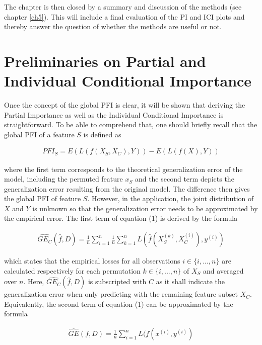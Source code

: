 \documentclass[]{krantz}
\begin{document}
The chapter is then closed by a summary and discussion of the methods
(see chapter \ref{ch5}). This will include a final evaluation of the PI
and ICI plots and thereby answer the question of whether the methods are
useful or not.

\pagebreak

\section{Preliminaries on Partial and Individual Conditional
Importance}\label{ch2}

Once the concept of the global PFI is clear, it will be shown that
deriving the Partial Importance as well as the Individual Conditional
Importance is straightforward. To be able to comprehend that, one should
briefly recall that the global PFI of a feature \(S\) is defined as

\begin{align}
PFI_{S} = E(L(f(X_{S}, X_{C}), Y)) - E(L(f(X), Y)) \label{eq:eq1}\tag{1}
\end{align}

where the first term corresponds to the theoretical generalization error
of the model, including the permuted feature \(x_{S}\) and the second
term depicts the generalization error resulting from the original model.
The difference then gives the global PFI of feature \(S\). However, in
the application, the joint distribution of \(X\) and \(Y\) is unknown so
that the generalization error needs to be approximated by the empirical
error. The first term of equation (1) is derived by the formula

\begin{align}
\widehat{GE_{C}}(\hat{f}, D) = \frac{1}{n} \sum_{i = 1}^{n}\frac{1}{n} \sum_{k = 1}^{n}L(\hat{f}(X_{S}^{(k)}, X_{C}^{(i)}),  y^{(i)}) \label{eq:e2}\tag{2}
\end{align}

which states that the empirical losses for all observations
\(i \in \{i, ..., n\}\) are calculated respectively for each permutation
\(k \in \{i, ..., n\}\) of \(X_{S}\) and averaged over \(n\). Here,
\(\widehat{GE_{C}}(\hat{f}, D)\) is subscripted with \(C\) as it shall
indicate the generalization error when only predicting with the
remaining feature subset \(X_{C}\). Equivalently, the second term of
equation (1) can be approximated by the formula

\begin{align}
\widehat{GE}(f, D) = \frac{1}{n}\sum_{i = 1}^{n}L(f(x^{(i)}, y^{(i)}) \label{eq:eq3}\tag{3}
\end{align}
\end{document}
